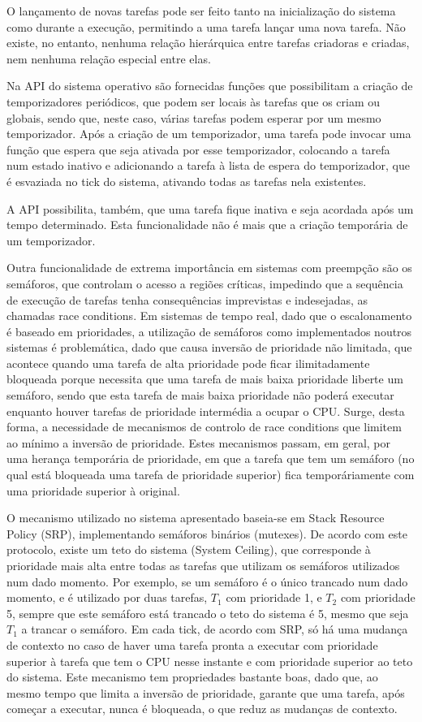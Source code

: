\documentclass[journal]{IEEEtran}
\begin{document}
O lançamento de novas tarefas pode ser feito tanto na inicialização do sistema como durante a execução, permitindo a uma tarefa lançar uma nova tarefa.
Não existe, no entanto, nenhuma relação hierárquica entre tarefas criadoras e criadas, nem nenhuma relação especial entre elas.

Na API do sistema operativo são fornecidas funções que possibilitam a criação de temporizadores periódicos, que podem ser locais às tarefas que os criam ou globais, sendo
que, neste caso, várias tarefas podem esperar por um mesmo temporizador.
Após a criação de um temporizador, uma tarefa pode invocar uma função que espera que seja ativada por esse temporizador, colocando a tarefa num estado inativo e
adicionando a tarefa à lista de espera do temporizador, que é esvaziada no tick do sistema, ativando todas as tarefas nela existentes.

A API possibilita, também, que uma tarefa fique inativa e seja acordada após um tempo determinado.
Esta funcionalidade não é mais que a criação temporária de um temporizador.

Outra funcionalidade de extrema importância em sistemas com preempção são os semáforos, que controlam o acesso a regiões críticas, impedindo que a sequência de execução
de tarefas tenha consequências imprevistas e indesejadas, as chamadas race conditions.
Em sistemas de tempo real, dado que o escalonamento é baseado em prioridades, a utilização de semáforos como implementados noutros sistemas é problemática, dado que causa
inversão de prioridade não limitada, que acontece quando uma tarefa de alta prioridade pode ficar ilimitadamente bloqueada porque necessita que uma tarefa de mais baixa
prioridade liberte um semáforo, sendo que esta tarefa de mais baixa prioridade não poderá executar enquanto houver tarefas de prioridade intermédia a ocupar o CPU.
Surge, desta forma, a necessidade de mecanismos de controlo de race conditions que limitem ao mínimo a inversão de prioridade.
Estes mecanismos passam, em geral, por uma herança temporária de prioridade, em que a tarefa que tem um semáforo (no qual está bloqueada uma tarefa de prioridade
superior) fica temporáriamente com uma prioridade superior à original.

O mecanismo utilizado no sistema apresentado baseia-se em Stack Resource Policy (SRP), implementando semáforos binários (mutexes).
De acordo com este protocolo, existe um teto do sistema (System Ceiling), que corresponde à prioridade mais alta entre todas as tarefas que utilizam os semáforos
utilizados num dado momento.
Por exemplo, se um semáforo é o único trancado num dado momento, e é utilizado por duas tarefas, $T_1$ com prioridade 1, e $T_2$ com prioridade 5, sempre que este
semáforo está trancado o teto do sistema é 5, mesmo que seja $T_1$ a trancar o semáforo.
Em cada tick, de acordo com SRP, só há uma mudança de contexto no caso de haver uma tarefa pronta a executar com prioridade superior à tarefa que tem o CPU nesse instante
e com prioridade superior ao teto do sistema.
Este mecanismo tem propriedades bastante boas, dado que, ao mesmo tempo que limita a inversão de prioridade, garante que uma tarefa, após começar a executar, nunca é
bloqueada, o que reduz as mudanças de contexto.
\end{document}
